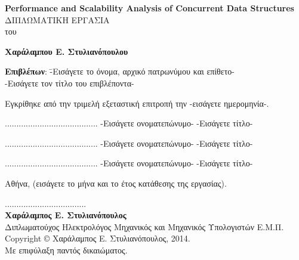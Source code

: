 \documentclass[12pt, twoside, a4paper]{report}
\begin{document}
\begin{center}
\vspace{8ex}
\large \textbf{\textlatin{Performance and Scalability Analysis of Concurrent Data Structures}} \\
\vspace{10ex}
\large
ΔΙΠΛΩΜΑΤΙΚΗ ΕΡΓΑΣΙΑ \\
\vspace{2ex}
\normalsize
του \\
\vspace{2ex}
\parbox[c]{0.4\textwidth} { \center\textbf{
Χαράλαμπου Ε. Στυλιανόπουλου }}
\vspace{10ex}
\flushleft
\begin{tabbing}
\textbf{Επιβλέπων}: \= -Εισάγετε το όνομα, αρχικό πατρωνύμου
			και επίθετο- \\
		    \> -Εισάγετε τον τίτλο του επιβλέποντα-
\end{tabbing}
\end{center}

\noindent
Εγκρίθηκε από την τριμελή εξεταστική επιτροπή την -εισάγετε ημερομηνία-.

\begin{center}
\scriptsize
\parbox[b]{0.3\textwidth} {\center
	........................................
	-Εισάγετε ονοματεπώνυμο-
	-Εισάγετε τίτλο-
}
\parbox[b]{0.3\textwidth} {\center
	........................................
	-Εισάγετε ονοματεπώνυμο-
	-Εισάγετε τίτλο-
}
\parbox[b]{0.3\textwidth} {\center
	........................................
	-Εισάγετε ονοματεπώνυμο-
	-Εισάγετε τίτλο-
}
\end{center}
\vspace{10ex}
\normalsize
\noindent
Αθήνα, (εισάγετε το μήνα και το έτος κατάθεσης της εργασίας).
\newpage
\hspace{10pt}

\vspace{30ex}
\noindent
................................... \\
\textbf{Χαράλαμπος Ε. Στυλιανόπουλος} \\
Διπλωματούχος Ηλεκτρολόγος Μηχανικός και Μηχανικός Υπολογιστών Ε.Μ.Π. \\
\vfill
\noindent
\textlatin{Copyright} © Χαράλαμπος Ε. Στυλιανόπουλος, 2014.\\
Με επιφύλαξη παντός δικαιώματος.\\
\end{document}
